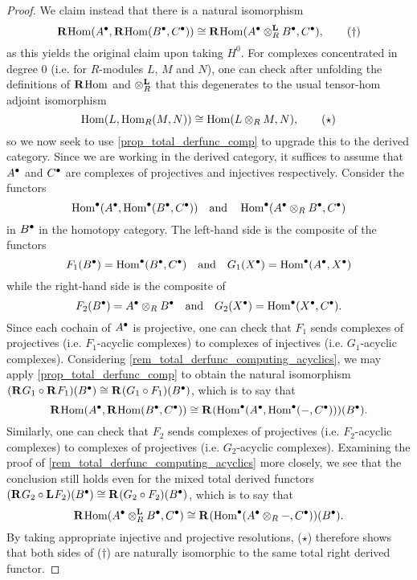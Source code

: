 \begin{proof}
  We claim instead that there is a natural isomorphism
  \[
    \derhom(\cochaincomp{A}, \derhom(\cochaincomp{B}, \cochaincomp{C}))
    \cong
    \derhom(\dertensor{R}{\cochaincomp{A}}{\cochaincomp{B}}, \cochaincomp{C}),
    \tag{$\dagger$}
  \]
  as this yields the original claim upon taking $H^0$.
  For complexes concentrated in degree 0 (i.e. for $R$-modules $L$,
  $M$ and $N$), one can check after unfolding the definitions of
  $\derhom$ and $\dertensorsymb_R$ that this degenerates to the usual
  tensor-hom adjoint isomorphism
  \[
    \Hom(L, \Hom_{R}(M, N)) \cong \Hom(L \tensor_R M, N), \tag{$\star$}
  \]
  so we now seek to use \cref{prop_total_derfunc_comp} to upgrade
  this to the derived category.
  Since we are working in the derived category, it suffices to assume
  that $\cochaincomp{A}$ and $\cochaincomp{C}$ are complexes of
  projectives and injectives respectively.
  Consider the functors
  \[
    \InnerHom(\cochaincomp{A}, \InnerHom(\cochaincomp{B}, \cochaincomp{C}))
    \mathand
    \InnerHom(\cochaincomp{A} \tensor_R \cochaincomp{B}, \cochaincomp{C})
  \]
  in $\cochaincomp{B}$ in the homotopy category.
  The left-hand side is the composite of the functors
  \[
    F_1(\cochaincomp{B}) = \InnerHom(\cochaincomp{B}, \cochaincomp{C})
    \mathand
    G_1(\cochaincomp{X}) = \InnerHom(\cochaincomp{A}, \cochaincomp{X})
  \]
  while the right-hand side is the composite of
  \[
    F_2(\cochaincomp{B}) = \cochaincomp{A} \tensor_R \cochaincomp{B}
    \mathand
    G_2(\cochaincomp{X}) = \InnerHom(\cochaincomp{X}, \cochaincomp{C}).
  \]
  Since each cochain of $\cochaincomp{A}$ is projective, one can
  check that $F_1$ sends complexes of projectives (i.e. $F_1$-acyclic
  complexes) to complexes of injectives (i.e. $G_1$-acyclic complexes).
  Considering \cref{rem_total_derfunc_computing_acyclics}, we may
  apply \cref{prop_total_derfunc_comp} to obtain the natural
  isomorphism $(\rightderfunc{G_1} \circ
  \rightderfunc{F_1})(\cochaincomp{B}) \cong \rightderfunc{(G_1 \circ
  F_1)}(\cochaincomp{B})$, which is to say that
  \[
    \derhom(\cochaincomp{A}, \derhom(\cochaincomp{B}, \cochaincomp{C}))
    \cong
    \rightderfunc{(\InnerHom(\cochaincomp{A}, \InnerHom(-,
    \cochaincomp{C})))}(\cochaincomp{B}).
  \]
  Similarly, one can check that $F_2$ sends complexes of projectives
  (i.e. $F_2$-acyclic complexes) to complexes of projectives (i.e.
  $G_2$-acyclic complexes).
  Examining the proof of \cref{rem_total_derfunc_computing_acyclics}
  more closely, we see that the conclusion still holds even for the
  mixed total derived functors $(\rightderfunc{G_2} \circ
  \leftderfunc{F_2})(\cochaincomp{B}) \cong \rightderfunc{(G_2 \circ
  F_2)}(\cochaincomp{B})$, which is to say that
  \[
    \derhom(\dertensor{R}{\cochaincomp{A}}{\cochaincomp{B}}, \cochaincomp{C})
    \cong
    \rightderfunc{(\InnerHom(\cochaincomp{A} \tensor_R -,
    \cochaincomp{C}))}(\cochaincomp{B}).
  \]
  By taking appropriate injective and projective resolutions,
  ($\star$) therefore shows that both sides of ($\dagger$) are
  naturally isomorphic to the same total right derived functor.
\end{proof}
